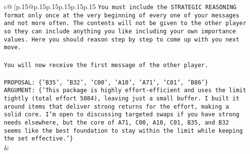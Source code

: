 \documentclass{article}
\begin{document}
{\begin{supertabular}{c@{$\;$}|p{.15\linewidth}@{}p{.15\linewidth}p{.15\linewidth}p{.15\linewidth}p{.15\linewidth}p{.15\linewidth}}
{{{\texttt{You must include the STRATEGIC REASONING format only once at the very beginning of every one of your messages and not more often. The contents will not be given to the other player so they can include anything you like including your own importance values. Here you should reason step by step to come up with you next move.} \\
\\ 
\texttt{You will now receive the first message of the other player.} \\
\\ 
\texttt{PROPOSAL: \{'B35', 'B32', 'C00', 'A10', 'A71', 'C01', 'B86'\}} \\
\texttt{ARGUMENT: \{'This package is highly effort{-}efficient and uses the limit tightly (total effort 5084), leaving just a small buffer. I built it around items that deliver strong returns for the effort, making a solid core. I’m open to discussing targeted swaps if you have strong needs elsewhere, but the core of A71, C00, A10, C01, B35, and B32 seems like the best foundation to stay within the limit while keeping the set effective.'\}} \\
            }
        }
    }
    & \\ \\


\end{supertabular}}
\end{document}
